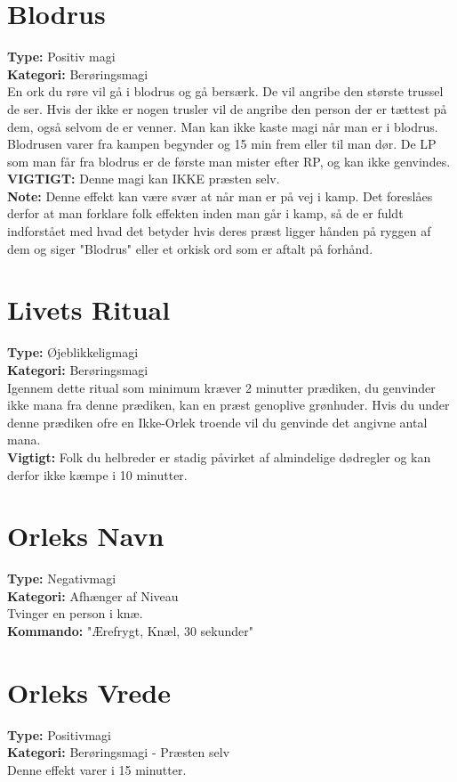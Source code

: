 \section{Blodrus}
\textbf{Type:} Positiv magi\\
\textbf{Kategori:} Berøringsmagi\\
En ork du røre vil gå i blodrus og gå bersærk. De vil angribe den største trussel de ser. Hvis der ikke er nogen trusler vil de angribe den person der er tættest på dem, også selvom de er venner. Man kan ikke kaste magi når man er i blodrus.
Blodrusen varer fra kampen begynder og 15 min frem eller til man dør. De LP som man får fra blodrus er de første man mister efter RP, og kan ikke genvindes.\\
\textbf{VIGTIGT:} Denne magi kan IKKE præsten selv.\\
\textbf{Note:} Denne effekt kan være svær at når man er på vej i kamp. Det foreslåes derfor at man forklare folk effekten inden man går i kamp, så de er fuldt indforstået med hvad det betyder hvis deres præst ligger hånden på ryggen af dem og siger "Blodrus" eller et orkisk ord som er aftalt på forhånd.

\section{Livets Ritual}
\textbf{Type:} Øjeblikkeligmagi\\ 
\textbf{Kategori:} Berøringsmagi\\
Igennem dette ritual som minimum kræver 2 minutter prædiken, du genvinder ikke mana fra denne prædiken, kan en præst genoplive grønhuder. Hvis du under denne prædiken ofre en Ikke-Orlek troende vil du genvinde det angivne antal mana.\\
\textbf{Vigtigt:} Folk du helbreder er stadig påvirket af almindelige dødregler og kan derfor ikke kæmpe i 10 minutter.

\section{Orleks Navn}
\textbf{Type:} Negativmagi\\ 
\textbf{Kategori:} Afhænger af Niveau\\
Tvinger en person i knæ.\\
\textbf{Kommando:} "Ærefrygt, Knæl, 30 sekunder"

\section{Orleks Vrede}
\textbf{Type:} Positivmagi\\
\textbf{Kategori:} Berøringsmagi - Præsten selv\\
Denne effekt varer i 15 minutter.\\

